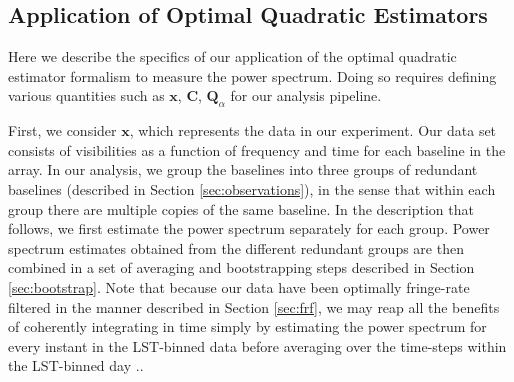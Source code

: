 \documentclass[twocolumn,numberedappendix]{emulateapj} \shorttitle{New Limits on the 21 cm Power Spectrum at $z=8.4$}
\newcommand{\x}{\mathbf{x}} \newcommand{\xhat}{\hat{\mathbf{x}}}
\newcommand{\phat}{\hat{\mathbf{p}}}
\newcommand{\qhat}{\hat{\mathbf{q}}}
\begin{document}
%


\subsection{Application of Optimal Quadratic Estimators}
\label{sec:oqe_app}

Here we describe the specifics of our application of the optimal quadratic
estimator formalism to measure the power spectrum. Doing so requires defining
various quantities such as $\x$, $\mathbf{C}$, $\mathbf{Q}_\alpha$ for our analysis
pipeline.

First, we consider $\x$, which represents the data in our experiment.  Our data set consists
of visibilities as a function of frequency and time for each baseline in the
array. In our analysis, we group the baselines into three groups of redundant baselines (described in
Section \ref{sec:observations}), 
in the sense that within each group there are multiple copies of the same baseline. In the
description that follows, we first estimate the power spectrum separately for each group.
Power spectrum estimates obtained from the different redundant groups are then combined in a set of averaging and bootstrapping steps described in Section \ref{sec:bootstrap}. Note that because
our data have been optimally fringe-rate filtered in the manner described in Section \ref{sec:frf},
we may reap all the benefits of coherently integrating in time simply by estimating the power spectrum
for every instant in the LST-binned data before averaging over the time-steps within the LST-binned day \citep{parsons_et_al2015}..
\end{document}
